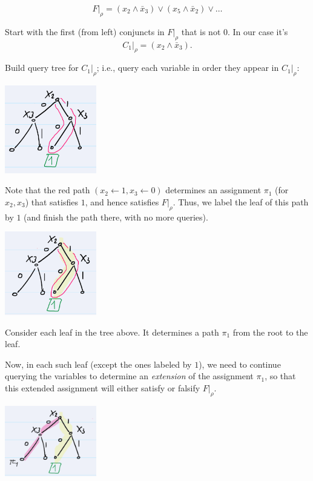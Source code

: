 \[
F|_{\rho} = (x_2 \land \bar{x}_3) \lor (x_5 \land \bar{x}_2) \lor \dots
\]

\noindent
Start with the first (from left) conjuncts in \( F|_{\rho} \) that is not \( 0 \). In our case it's
\[
C_1|_{\rho} = (x_2 \land \bar{x}_3).
\]

\noindent
Build query tree for \( C_1|_{\rho} \); i.e., query each variable in order they appear in \( C_1|_{\rho} \):
 
 
 \includegraphics[width=0.3\textwidth]{images/1st-ex-dt.png}
 
 
\noindent
Note that the red path \((x_2 \gets 1, x_3 \gets 0)\) determines an assignment \( \pi_1 \) (for \( x_2, x_3 \)) that satisfies \( 1 \), and hence satisfies \( F|_{\rho} \). Thus, we label the leaf of this path by \( 1 \) (and finish the path there, with no more queries).


\noindent 



\includegraphics[width=0.3\textwidth]{images/ex2-sl-dt.png}

\noindent
Consider each leaf in the tree above. It determines a path \( \pi_1 \) from the root to the leaf.

\noindent
Now, in each such leaf (except the ones labeled by \( 1 \)), we need to continue querying the variables to determine an \textit{extension} of the assignment \( \pi_1 \), so that this extended assignment will either satisfy or falsify \( F|_{\rho} \).


\includegraphics[width=0.3\textwidth]{images/ex3-sl-dt.png}
\noindent

